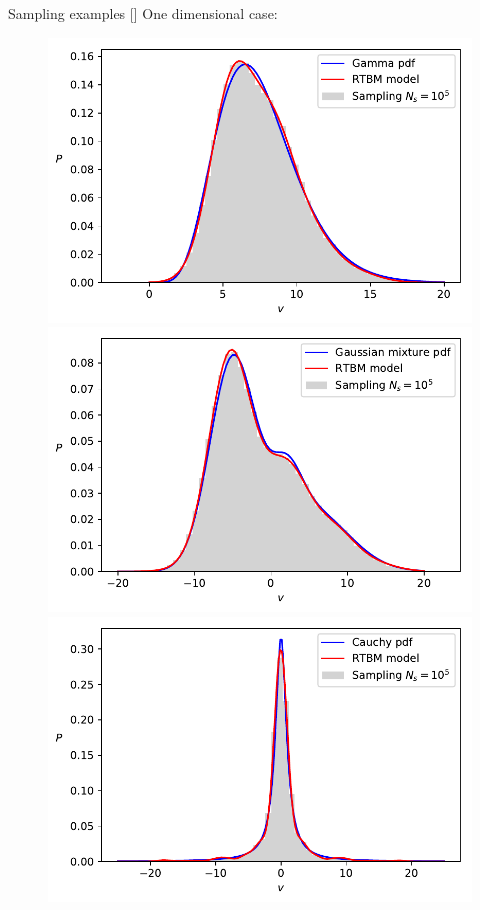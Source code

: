 \documentclass[10pt]{beamer}
\begin{document}
\begin{frame}{Sampling examples \hfill \small [\cite{Carrazza:2018nmd}]}
    One dimensional case:
    \begin{figure}[t!]
        \begin{center}
        \includegraphics[scale=0.30]{figures/gamma.pdf}
        \includegraphics[scale=0.30]{figures/gaussianmix.pdf}
        \includegraphics[scale=0.30]{figures/cauchy.pdf}



\end{center}
\end{figure}
\end{frame}
\end{document}
